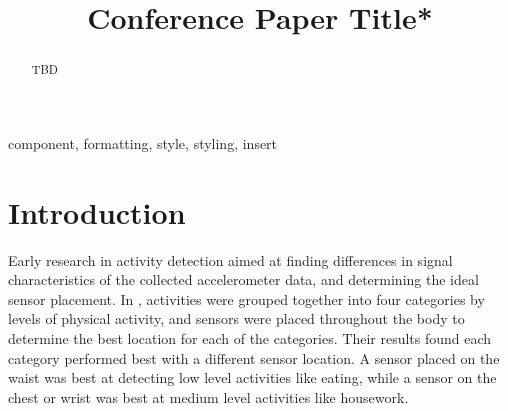 \documentclass[conference]{IEEEtran}
\begin{document}
\title{Conference Paper Title*
}

\author{
\and
{}
\and
{}
}

\maketitle

\begin{abstract}
TBD
\end{abstract}

\begin{IEEEkeywords}
component, formatting, style, styling, insert
\end{IEEEkeywords}

\section{Introduction}

Early research in activity detection aimed at finding differences in signal characteristics of the collected accelerometer data, and determining the ideal sensor placement. 
In \cite{2011_Sensor_Positioning}, activities were grouped together into four categories by levels of physical activity, and sensors were placed throughout the body to determine the best location for each of the categories.
Their results found each category performed best with a different sensor location. A sensor placed on the waist was best at detecting low level activities like eating, while a sensor on the chest or wrist was best at medium level activities like housework.
\end{document}
